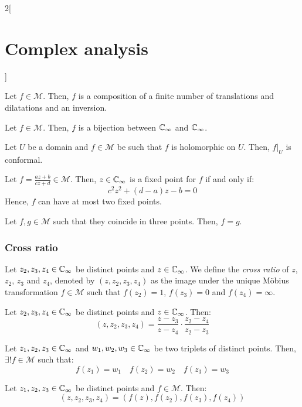 \documentclass[../../../main_math.tex]{subfiles}
\begin{document}
\begin{multicols}{2}[\section{Complex analysis}]
\begin{theorem}
    Let $f\in\mathcal{M}$. Then, $f$ is a composition of a finite number of translations and dilatations and an inversion.
  \end{theorem}
  \begin{proposition}
    Let $f\in\mathcal{M}$. Then, $f$ is a bijection between $\mathbb{C}_\infty$ and $\mathbb{C}_\infty$.
  \end{proposition}
  \begin{proposition}
    Let $U$ be a domain and $f\in\mathcal{M}$ be such that $f$ is holomorphic on $U$. Then, $f|_{U}$ is conformal.
  \end{proposition}
  \begin{proposition}
    Let $f=\frac{az+b}{cz+d}\in\mathcal{M}$. Then, $z\in\mathbb{C}_\infty$ is a fixed point for $f$ if and only if: $$c^2z^2+(d-a)z-b=0$$
    Hence, $f$ can have at most two fixed points.
  \end{proposition}
  \begin{corollary}
    Let $f,g\in\mathcal{M}$ such that they coincide in three points. Then, $f=g$.
  \end{corollary}
  \subsubsection{Cross ratio}
  \begin{definition}
    Let $z_2,z_3,z_4\in\mathbb{C}_\infty$ be distinct points and $z\in\mathbb{C}_\infty$. We define the \emph{cross ratio} of $z$, $z_2$, $z_3$ and $z_4$, denoted by $(z,z_2,z_3,z_4)$ as the image under the unique Möbius transformation $f\in\mathcal{M}$ such that $f(z_2)=1$, $f(z_3)=0$ and $f(z_4)=\infty$.
  \end{definition}
  \begin{proposition}
    Let $z_2,z_3,z_4\in\mathbb{C}_\infty$ be distinct points and $z\in\mathbb{C}_\infty$. Then: $$(z,z_2,z_3,z_4)=\frac{z-z_3}{z-z_4}\cdot\frac{z_2-z_4}{z_2-z_3}$$
  \end{proposition}
  \begin{corollary}
    Let $z_1,z_2,z_3\in\mathbb{C}_\infty$ and $w_1,w_2,w_3\in\mathbb{C}_\infty$ be two triplets of distinct points. Then, $\exists! f\in\mathcal{M}$ such that: $$f(z_1)=w_1\quad f(z_2)=w_2\quad f(z_3)=w_3$$
  \end{corollary}
  \begin{theorem}
    Let $z_1,z_2,z_3\in\mathbb{C}_\infty$ be distinct points and $f\in\mathcal{M}$. Then: $$(z,z_2,z_3,z_4)=(f(z),f(z_2),f(z_3),f(z_4))$$
  \end{theorem}

\end{multicols}
\end{document}
